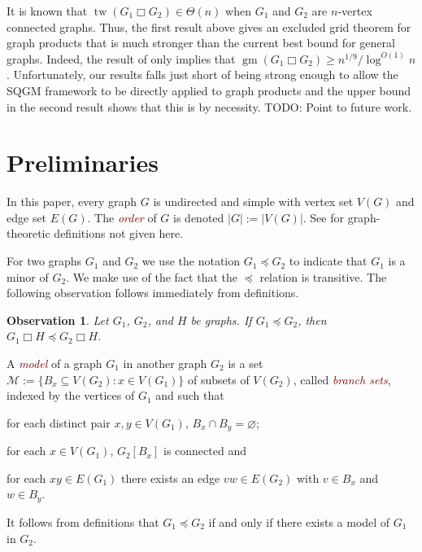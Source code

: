 \documentclass[kpfonts,lotsofwhite]{patmorin}
\newcommand{\defn}[1]{\textcolor{Maroon}{\emph{#1}}}
\newcommand{\boxprod}{\mathbin{\Box}}
\renewcommand{\emptyset}{\varnothing}
\renewcommand{\ge}{\geqslant}
\DeclareMathOperator{\tw}{tw}
\DeclareMathOperator{\gm}{gm}
\theoremstyle{plain}
\newtheorem{obs}[thm]{Observation}
\theoremstyle{definition}
\begin{document}
It is known that $\tw(G_1\boxprod G_2)\in\Theta(n)$ when $G_1$ and $G_2$ are $n$-vertex connected graphs.  Thus, the first result above gives an excluded grid theorem for graph products that is much stronger than the current best bound for general graphs. Indeed, the result of \cite{CT19} only implies that $\gm(G_1\boxprod G_2) \ge n^{1/9}/\log^{O(1)} n$.  Unfortunately, our results falls just short of being strong enough to allow the SQGM framework to be directly applied to graph products and the upper bound in the second result shows that this is by necessity.  TODO: Point to future work.

\section{Preliminaries}

In this paper, every graph $G$ is undirected and simple with vertex set $V(G)$ and edge set $E(G)$. The \defn{order} of $G$ is denoted $|G|:=|V(G)|$.
 See \citet{D10} for graph-theoretic definitions not given here.




For two graphs $G_1$ and $G_2$ we use the notation $G_1\preceq G_2$ to indicate that $G_1$ is a minor of $G_2$.  We make use of the fact that the $\preceq$ relation is transitive. The following observation follows immediately from definitions.

\begin{obs}\label{minor_product}
  Let $G_1$, $G_2$, and $H$ be graphs.  If $G_1\preceq G_2$, then $G_1\boxprod H\preceq G_2\boxprod H$.
\end{obs}

A \defn{model} of a graph $G_1$ in another graph $G_2$ is a set $\mathcal{M}:=\{B_x\subseteq V(G_2): x\in V(G_1)\}$ of subsets of $V(G_2)$, called \defn{branch sets}, indexed by the vertices of $G_1$ and such that
\begin{compactenum}[(i)]
  \item for each distinct pair $x,y\in V(G_1)$, $B_x\cap B_y=\emptyset$;
  \item for each $x\in V(G_1)$, $G_2[B_x]$ is connected and
  \item for each $xy\in E(G_1)$ there exists an edge $vw\in E(G_2)$ with $v\in B_x$ and $w\in B_y$.
\end{compactenum}
It follows from definitions that $G_1\preceq G_2$ if and only if there exists a model of $G_1$ in $G_2$.
\end{document}
